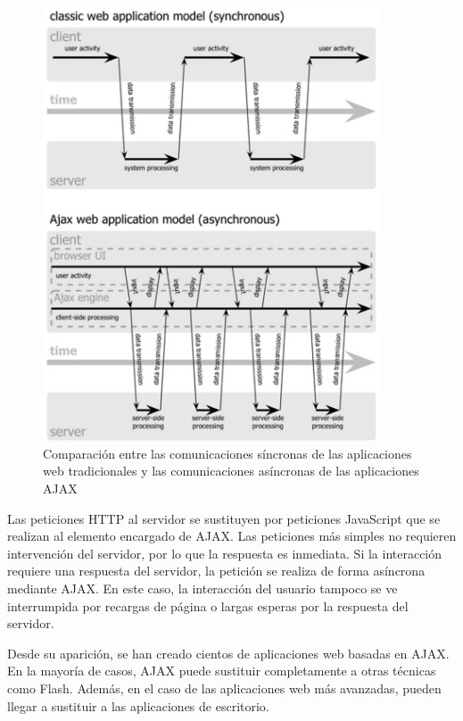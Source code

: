    \begin{figure}[H]
      \centering
        \includegraphics[width=10cm]{./eps/tecnologias/ajax_comunicaciones.eps}
      \caption{Comparación entre las comunicaciones síncronas de las aplicaciones web tradicionales y las comunicaciones asíncronas de las aplicaciones AJAX}
      \label{fig:tec_ajax_comparaciones}
    \end{figure}
    
    Las peticiones HTTP al servidor se sustituyen por peticiones JavaScript que se realizan al elemento encargado de AJAX. Las peticiones más simples no requieren intervención del servidor, por lo que la respuesta es inmediata. Si la interacción requiere una respuesta del servidor, la petición se realiza de forma asíncrona mediante AJAX. En este caso, la interacción del usuario tampoco se ve interrumpida por recargas de página o largas esperas por la respuesta del servidor.

    Desde su aparición, se han creado cientos de aplicaciones web basadas en AJAX. En la mayoría de casos, AJAX puede sustituir completamente a otras técnicas como Flash. Además, en el caso de las aplicaciones web más avanzadas, pueden llegar a sustituir a las aplicaciones de escritorio.
  
  


%
%
\newpage
\thispagestyle{empty}